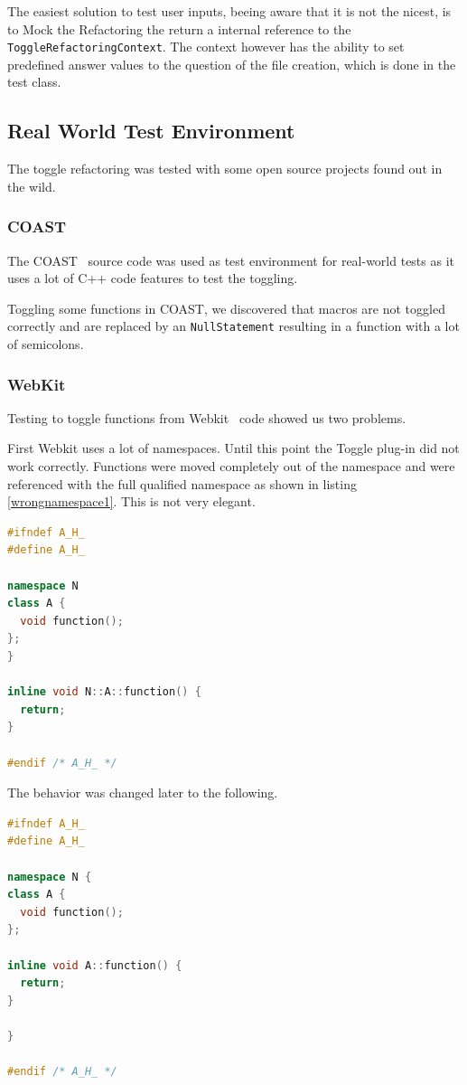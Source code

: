 The easiest solution to test user inputs, beeing aware that it is not the
nicest, is to Mock the Refactoring the return a internal reference to the
\texttt{ToggleRefactoringContext}. The context however has the ability to set
predefined answer values to the question of the file creation, which is done in
the test class.

\subsection{Real World Test Environment}

The toggle refactoring was tested with some open source projects found out in
the wild.

\subsubsection{COAST}
The COAST~\cite{COAST} source code was used as test environment for real-world 
tests as it uses a lot of C++ code features to test the toggling.

Toggling some functions in COAST, we discovered that macros are not toggled
correctly and are replaced by an \texttt{NullStatement} resulting in a function
with a lot of semicolons.

\subsubsection{WebKit}
Testing to toggle functions from Webkit~\cite{Webkit} code showed us two
problems.

First Webkit uses a lot of namespaces. Until this point the Toggle
plug-in did not work correctly. Functions were moved completely out of the
namespace and were referenced with the full qualified namespace as shown in
listing \ref{wrongnamespace1}. This is not very elegant.

\begin{lstlisting}[caption={\texttt{function()} with reference to namespace},
label={wrongnamespace1}, language=C++]
#ifndef A_H_
#define A_H_

namespace N
class A {
  void function();
};
}

inline void N::A::function() {
  return;
}

#endif /* A_H_ */
\end{lstlisting}

The behavior was changed later to the following.

\begin{lstlisting}[caption={A.h, function definition in namespace},
label={wrongnamespace2}, language=C++]
#ifndef A_H_
#define A_H_

namespace N {
class A {
  void function();
};

inline void A::function() {
  return;
}

}

#endif /* A_H_ */
\end{lstlisting}

